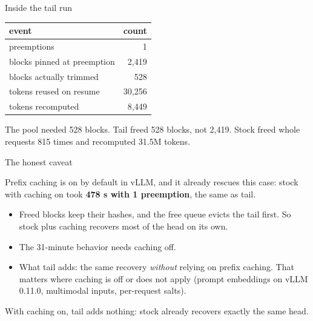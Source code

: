 \documentclass[aspectratio=169]{beamer}
\begin{document}
\begin{frame}{Inside the tail run}

\begin{center}
\begin{tabular}{lr}
\toprule
event & count \\
\midrule
preemptions & 1 \\
blocks pinned at preemption & 2{,}419 \\
blocks actually trimmed & 528 \\
tokens reused on resume & 30{,}256 \\
tokens recomputed & 8{,}449 \\
\bottomrule
\end{tabular}
\end{center}

The pool needed 528 blocks. Tail freed 528 blocks, not 2{,}419.
Stock freed whole requests 815 times and recomputed 31.5M tokens.

\end{frame}

\begin{frame}{The honest caveat}

Prefix caching is on by default in vLLM, and it already rescues this case:
stock with caching on took \textbf{478 s with 1 preemption}, the same as tail.

\begin{itemize}
  \item Freed blocks keep their hashes, and the free queue evicts the tail first.
    So stock plus caching recovers most of the head on its own.
  \item The 31-minute behavior needs caching off.
  \item What tail adds: the same recovery \emph{without} relying on prefix caching.
    That matters where caching is off or does not apply (prompt embeddings on vLLM 0.11.0, multimodal inputs, per-request salts).
\end{itemize}

With caching on, tail adds nothing: stock already recovers exactly the same head.

\end{frame}
\end{document}
